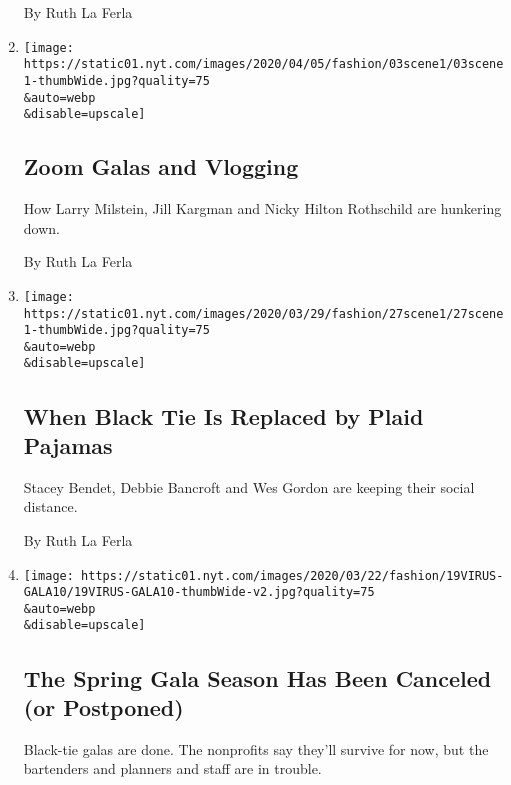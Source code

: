 \begin{enumerate}
  By Ruth La Ferla
\item
  \href{/2020/04/03/style/zoom-galas-and-vlogging.html}{}

  \texttt{[image: https://static01.nyt.com/images/2020/04/05/fashion/03scene1/03scene1-thumbWide.jpg?quality=75\\\&auto=webp\\\&disable=upscale]}

  \hypertarget{zoom-galas-and-vlogging}{%
  \subsection{Zoom Galas and Vlogging}\label{zoom-galas-and-vlogging}}

  How Larry Milstein, Jill Kargman and Nicky Hilton Rothschild are
  hunkering down.

  By Ruth La Ferla
\item
  \href{/2020/03/27/style/when-black-tie-is-replaced-by-plaid-pajamas.html}{}

  \texttt{[image: https://static01.nyt.com/images/2020/03/29/fashion/27scene1/27scene1-thumbWide.jpg?quality=75\\\&auto=webp\\\&disable=upscale]}

  \hypertarget{when-black-tie-is-replaced-by-plaid-pajamas}{%
  \subsection{When Black Tie Is Replaced by Plaid
  Pajamas}\label{when-black-tie-is-replaced-by-plaid-pajamas}}

  Stacey Bendet, Debbie Bancroft and Wes Gordon are keeping their social
  distance.

  By Ruth La Ferla
\item
  \href{/2020/03/19/fashion/gala-philanthropy-charity-parties-canceled-coronavirus.html}{}

  \texttt{[image: https://static01.nyt.com/images/2020/03/22/fashion/19VIRUS-GALA10/19VIRUS-GALA10-thumbWide-v2.jpg?quality=75\\\&auto=webp\\\&disable=upscale]}

  \hypertarget{the-spring-gala-season-has-been-canceled-or-postponed}{%
  \subsection{The Spring Gala Season Has Been Canceled (or
  Postponed)}\label{the-spring-gala-season-has-been-canceled-or-postponed}}

  Black-tie galas are done. The nonprofits say they'll survive for now,
  but the bartenders and planners and staff are in trouble.


\end{enumerate}
